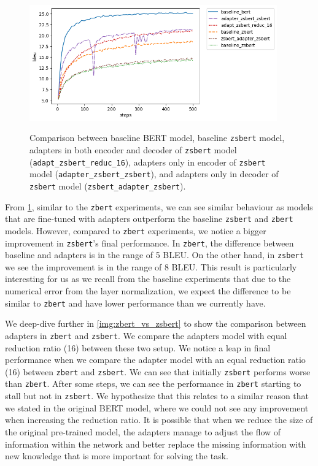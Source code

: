 \begin{figure}[h]
    {\includegraphics[width=0.95\textwidth]{img/zsbert_pos.png}}
    \centering
    \caption[Comparison between baseline BERT and \texttt{zsbert} models.]{Comparison between baseline BERT model, baseline \texttt{zsbert} model, adapters in both encoder and decoder of \texttt{zsbert} model (\texttt{adapt\_zsbert\_reduc\_16}), adapters only in encoder of \texttt{zsbert} model (\texttt{adapter\_zsbert\_zsbert}), and adapters only in decoder of \texttt{zsbert} model (\texttt{zsbert\_adapter\_zsbert}).}
    \label{img:zsbert_pos}
\end{figure}

From \cref{img:zsbert_pos}, similar to the \texttt{zbert} experiments, we can see similar behaviour as models that are fine-tuned with adapters outperform the baseline \texttt{zsbert} and \texttt{zbert} models. However, compared to \texttt{zbert} experiments, we notice a bigger improvement in \texttt{zsbert}'s final performance. In \texttt{zbert}, the difference between baseline and adapters is in the range of 5 BLEU. On the other hand, in \texttt{zsbert} we see the improvement is in the range of 8 BLEU. This result is particularly interesting for us as we recall from the baseline experiments that due to the numerical error from the layer normalization, we expect the difference to be similar to \texttt{zbert} and have lower performance than we currently have.

We deep-dive further in \cref{img:zbert_vs_zsbert} to show the comparison between adapters in \texttt{zbert} and \texttt{zsbert}. We compare the adapters model with equal reduction ratio (16) between these two setup. We notice a leap in final performance when we compare the adapter model with an equal reduction ratio (16) between \texttt{zbert} and \texttt{zsbert}. We can see that initially \texttt{zsbert} performs worse than \texttt{zbert}. After some steps, we can see the performance in \texttt{zbert} starting to stall but not in \texttt{zsbert}. We hypothesize that this relates to a similar reason that we stated in the original BERT model, where we could not see any improvement when increasing the reduction ratio. It is possible that when we reduce the size of the original pre-trained model, the adapters manage to adjust the flow of information within the network and better replace the missing information with new knowledge that is more important for solving the task.

